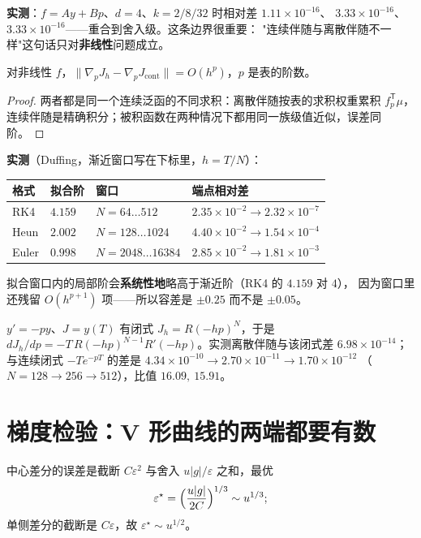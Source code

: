 \textbf{实测}：$f=Ay+Bp$、$d=4$、$k=2/8/32$ 时相对差 $1.11\times10^{-16}$、
$3.33\times10^{-16}$、$3.33\times10^{-16}$——重合到舍入级。这条边界很重要：
"连续伴随与离散伴随不一样"这句话只对\textbf{非线性}问题成立。

\begin{theorem}[非线性时差是 $O(h^p)$]\label{thm:gap-order}
对非线性 $f$，$\|\nabla_pJ_h-\nabla_pJ_{\text{cont}}\|=O(h^p)$，$p$ 是表的阶数。
\end{theorem}

\begin{proof}
两者都是同一个连续泛函的不同求积：离散伴随按表的求积权重累积 $f_p^{\mathsf T}\mu$，
连续伴随是精确积分；被积函数在两种情况下都用同一族级值近似，误差同阶。
\end{proof}

\textbf{实测}（Duffing，渐近窗口写在下标里，$h=T/N$）：

\begin{center}
\begin{tabular}{llll}
\hline
格式 & 拟合阶 & 窗口 & 端点相对差 \\
\hline
RK4 & $4.159$ & $N=64\ldots512$ & $2.35\times10^{-2}\to2.32\times10^{-7}$ \\
Heun & $2.002$ & $N=128\ldots1024$ & $4.40\times10^{-2}\to1.54\times10^{-4}$ \\
Euler & $0.998$ & $N=2048\ldots16384$ & $2.85\times10^{-2}\to1.81\times10^{-3}$ \\
\hline
\end{tabular}
\end{center}

拟合窗口内的局部阶会\textbf{系统性地}略高于渐近阶（RK4 的 $4.159$ 对 $4$），
因为窗口里还残留 $O(h^{p+1})$ 项——所以容差是 $\pm0.25$ 而不是 $\pm0.05$。

\begin{corollary}[标量模型上称重]\label{cor:scalar-weight}
$y'=-py$、$J=y(T)$ 有闭式 $J_h=R(-hp)^N$，于是
$dJ_h/dp=-T\,R(-hp)^{N-1}R'(-hp)$。实测离散伴随与该闭式差 $6.98\times10^{-14}$；
与连续闭式 $-Te^{-pT}$ 的差是 $4.34\times10^{-10}\to2.70\times10^{-11}\to1.70\times10^{-12}$
（$N=128\to256\to512$），比值 $16.09,\ 15.91$。
\end{corollary}

\section{梯度检验：V 形曲线的两端都要有数}

\begin{theorem}[最优差分步长]\label{thm:optimal-eps}
中心差分的误差是截断 $C\varepsilon^2$ 与舍入 $u|g|/\varepsilon$ 之和，最优
\[
\varepsilon^\star=\Bigl(\frac{u|g|}{2C}\Bigr)^{1/3}\sim u^{1/3};
\]
单侧差分的截断是 $C\varepsilon$，故 $\varepsilon^\star\sim u^{1/2}$。
\end{theorem}

